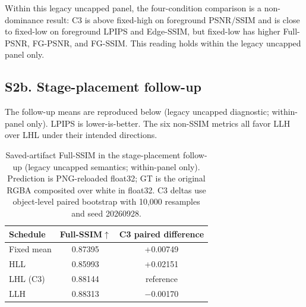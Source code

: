 \documentclass[10pt]{article}
\begin{document}
Within this legacy uncapped panel, the four-condition comparison is a
non-dominance result: C3 is above fixed-high on foreground PSNR/SSIM and is
close to fixed-low on foreground LPIPS and Edge-SSIM, but fixed-low has
higher Full-PSNR, FG-PSNR, and FG-SSIM. This reading holds within the legacy
uncapped panel only.

\subsection{S2b. Stage-placement follow-up}

The follow-up means are reproduced below (legacy uncapped diagnostic;
within-panel only). LPIPS is lower-is-better. The six non-SSIM metrics all
favor LLH over LHL under their intended directions.

\begin{table}[h]
\centering\scriptsize
{}
\end{table}

\begin{table}[h]
\centering\small
\caption{Saved-artifact Full-SSIM in the stage-placement follow-up (legacy uncapped semantics; within-panel only). Prediction is PNG-reloaded float32; GT is the original RGBA composited over white in float32. C3 deltas use object-level paired bootstrap with 10,000 resamples and seed 20260928.}
\begin{tabular}{lcc}
\toprule
Schedule & Full-SSIM$\uparrow$ & C3 paired difference \\
\midrule
Fixed mean & 0.87395 & +0.00749 \\
HLL & 0.85993 & +0.02151 \\
LHL (C3) & 0.88144 & reference \\
LLH & 0.88313 & $-$0.00170 \\
\bottomrule
\end{tabular}
\end{table}
\end{document}
